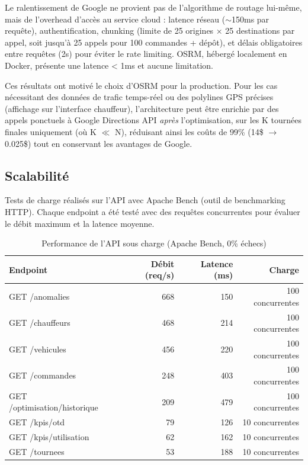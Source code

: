 \documentclass[12pt,a4paper]{report}
\begin{document}
Le ralentissement de Google ne provient pas de l'algorithme de routage lui-même, mais de l'overhead d'accès au service cloud : latence réseau ($\sim$150ms par requête), authentification, chunking (limite de 25 origines × 25 destinations par appel, soit jusqu'à 25 appels pour 100 commandes + dépôt), et délais obligatoires entre requêtes (2s) pour éviter le rate limiting. OSRM, hébergé localement en Docker, présente une latence < 1ms et aucune limitation.

Ces résultats ont motivé le choix d'OSRM pour la production. Pour les cas nécessitant des données de trafic temps-réel ou des polylines GPS précises (affichage sur l'interface chauffeur), l'architecture peut être enrichie par des appels ponctuels à Google Directions API \emph{après} l'optimisation, sur les K tournées finales uniquement (où K $\ll$ N), réduisant ainsi les coûts de 99\% (14\$ $\rightarrow$ 0.025\$) tout en conservant les avantages de Google.

\subsection{Scalabilité}

Tests de charge réalisés sur l'API avec Apache Bench (outil de benchmarking HTTP). Chaque endpoint a été testé avec des requêtes concurrentes pour évaluer le débit maximum et la latence moyenne.

\begin{table}[H]
\centering
\small
\begin{tabular}{lrrr}
\toprule
\textbf{Endpoint} & \textbf{Débit (req/s)} & \textbf{Latence (ms)} & \textbf{Charge} \\
\midrule
GET /anomalies          & 668 & 150 & 100 concurrentes \\
GET /chauffeurs         & 468 & 214 & 100 concurrentes \\
GET /vehicules          & 456 & 220 & 100 concurrentes \\
GET /commandes          & 248 & 403 & 100 concurrentes \\
GET /optimisation/historique & 209 & 479 & 100 concurrentes \\
GET /kpis/otd           & 79  & 126 & 10 concurrentes  \\
GET /kpis/utilisation   & 62  & 162 & 10 concurrentes  \\
GET /tournees           & 53  & 188 & 10 concurrentes  \\
\bottomrule
\end{tabular}
\caption{Performance de l'API sous charge (Apache Bench, 0\% échecs)}
\label{tab:api-scalability}
\end{table}
\end{document}
